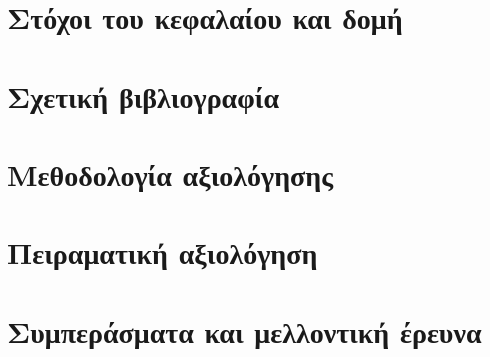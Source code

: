 \section{Στόχοι του κεφαλαίου και δομή}
  \label{section:02_01_01}

\section{Σχετική βιβλιογραφία}
  \label{section:02_01_02}
  

\section{Μεθοδολογία αξιολόγησης}
  \label{section:02_01_03}
  

\section{Πειραματική αξιολόγηση}
  \label{section:02_01_04}
  

\section{Συμπεράσματα και μελλοντική έρευνα}
  \label{section:02_01_05}
